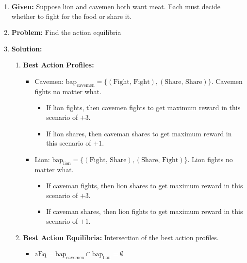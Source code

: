 \begin{example}
    \begin{enumerate}
        \item \textbf{Given:} Suppose lion and cavemen both want meat. Each must decide whether to fight for the food or share it. 
        \item \textbf{Problem:} Find the action equilibria 
        \item \textbf{Solution:}
        \begin{enumerate}
            \item \textbf{Best Action Profiles:}
            \begin{itemize}
                \item Cavemen: $\text{bap}_{\text{cavemen}} = \{(\text{Fight, Fight}), (\text{Share, Share})\}$. Cavemen fights no matter what. 
                \begin{itemize}
                    \item If lion fights, then cavemen fights to get maximum reward in this scenario of $+3$. 
                    \item If lion shares, then caveman shares to get maximum reward in this scenario of $+1$.
                \end{itemize}
                \item Lion: $\text{bap}_{\text{lion}} = \{(\text{Fight, Share}), (\text{Share, Fight})\}$. Lion fights no matter what.
                \begin{itemize}
                    \item If caveman fights, then lion shares to get maximum reward in this scenario of $+3$.
                    \item If caveman shares, then lion fights to get maximum reward in this scenario of $+1$.
                \end{itemize}
            \end{itemize}
            \item \textbf{Best Action Equilibria:} Intersection of the best action profiles.
            \begin{itemize}
                \item $\text{aEq} = \text{bap}_{\text{cavemen}} \cap \text{bap}_{\text{lion}} = \emptyset$
            \end{itemize}
        \end{enumerate}
    \end{enumerate}
\end{example}
\newpage

